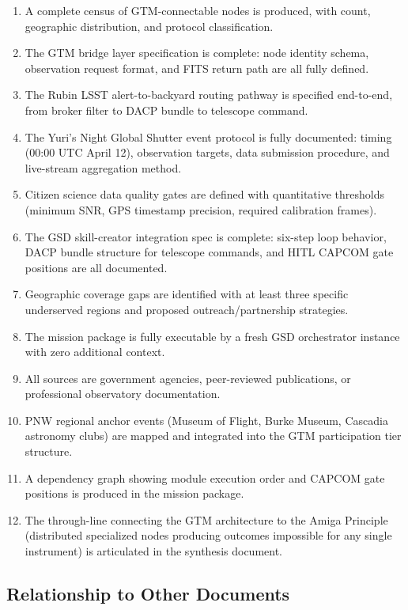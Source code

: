 \documentclass[11pt,letterpaper]{article}
\begin{document}
\begin{enumerate}
  \item A complete census of GTM-connectable nodes is produced, with count, geographic distribution, and protocol classification.
  \item The GTM bridge layer specification is complete: node identity schema, observation request format, and FITS return path are all fully defined.
  \item The Rubin LSST alert-to-backyard routing pathway is specified end-to-end, from broker filter to DACP bundle to telescope command.
  \item The Yuri's Night Global Shutter event protocol is fully documented: timing (00:00 UTC April 12), observation targets, data submission procedure, and live-stream aggregation method.
  \item Citizen science data quality gates are defined with quantitative thresholds (minimum SNR, GPS timestamp precision, required calibration frames).
  \item The GSD skill-creator integration spec is complete: six-step loop behavior, DACP bundle structure for telescope commands, and HITL CAPCOM gate positions are all documented.
  \item Geographic coverage gaps are identified with at least three specific underserved regions and proposed outreach/partnership strategies.
  \item The mission package is fully executable by a fresh GSD orchestrator instance with zero additional context.
  \item All sources are government agencies, peer-reviewed publications, or professional observatory documentation.
  \item PNW regional anchor events (Museum of Flight, Burke Museum, Cascadia astronomy clubs) are mapped and integrated into the GTM participation tier structure.
  \item A dependency graph showing module execution order and CAPCOM gate positions is produced in the mission package.
  \item The through-line connecting the GTM architecture to the Amiga Principle (distributed specialized nodes producing outcomes impossible for any single instrument) is articulated in the synthesis document.
\end{enumerate}

\subsection{Relationship to Other Documents}
\end{document}
